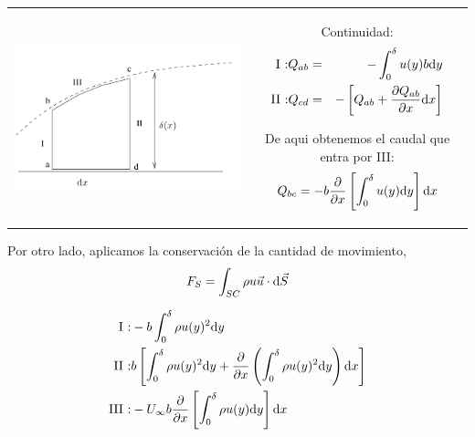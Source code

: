 	
	\begin{tabular}{cc}
		\begin{minipage}[c]{0.4\textwidth}%
			\begin{center}
				\includegraphics[width=1\linewidth]{TeX_files/chapter08-CapaLimite/vonKarman}
			\end{center}
			
		\end{minipage} & %
		\begin{minipage}[c]{0.5\textwidth}%
			Continuidad: 
			\begin{eqnarray*}
				\text{I :}Q_{ab} & = & -\int_{0}^{\delta}u(y)b\text{d} y\\
				\text{II :}Q_{cd} & = & -\left[Q_{ab}+\frac{\partial Q_{ab}}{\partial x}\text{d} x\right]
			\end{eqnarray*}
			
			De aqui obtenemos el caudal que entra por III: 
			\[
			Q_{bc}=-b\frac{\partial }{\partial x}\left[\int_{0}^{\delta}u(y)\text{d} y\right]\text{d} x
			\]
		\end{minipage}\tabularnewline
	\end{tabular}

	
	Por otro lado, aplicamos la conservación de la cantidad de movimiento,
	\[
	F_{S}=\int_{SC}\rho u\vec{u}\cdot\text{d}\vec{S}
	\]
	
	\begin{eqnarray*}
		\text{I :} & -b\int_{0}^{\delta}\rho u(y)^{2}\text{d} y\\
		\text{II :} & b\left[\int_{0}^{\delta}\rho u(y)^{2}\text{d} y+\frac{\partial }{\partial x}\left(\int_{0}^{\delta}\rho u(y)^{2}\text{d} y\right)\text{d} x\right]\\
		\text{III :} & -U_{\infty}b\frac{\partial }{\partial x}\left[\int_{0}^{\delta}\rho u(y)\text{d} y\right]\text{d} x
	\end{eqnarray*}
	
